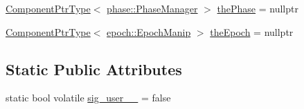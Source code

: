 \begin{DoxyCompactItemize}
\item 
\hyperlink{structvt_1_1runtime_1_1_runtime_a0893bf0a8c03b898e8ab66b52cec80ad}{Component\+Ptr\+Type}$<$ \hyperlink{structvt_1_1phase_1_1_phase_manager}{phase\+::\+Phase\+Manager} $>$ \hyperlink{structvt_1_1runtime_1_1_runtime_aaad9fd5e7f0bb2d4bcc73fe1ce60bd9f}{the\+Phase} = nullptr
\item 
\hyperlink{structvt_1_1runtime_1_1_runtime_a0893bf0a8c03b898e8ab66b52cec80ad}{Component\+Ptr\+Type}$<$ \hyperlink{structvt_1_1epoch_1_1_epoch_manip}{epoch\+::\+Epoch\+Manip} $>$ \hyperlink{structvt_1_1runtime_1_1_runtime_aa126046508c7d6e6d8470fec07160c8e}{the\+Epoch} = nullptr
\end{DoxyCompactItemize}
\subsection*{Static Public Attributes}
\begin{DoxyCompactItemize}
\item 
static bool volatile \hyperlink{structvt_1_1runtime_1_1_runtime_ac0373f2326b45f348e2db166d328e2d6}{sig\+\_\+user\+\_\+\_\+} = false
\end{DoxyCompactItemize}
